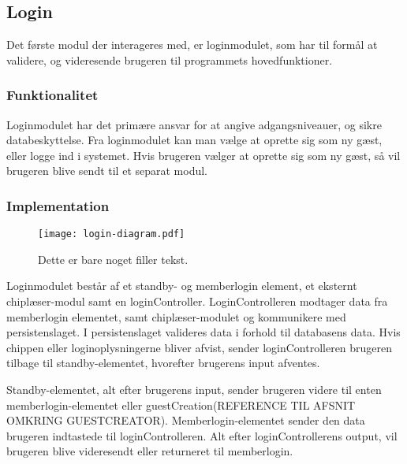 \subsection{Login}
\label{sub:login}

Det første modul der interageres med, er loginmodulet, som har til formål at validere, og videresende brugeren til programmets hovedfunktioner.

\subsubsection{Funktionalitet}
\label{ssub:login_funktionalitet}

Loginmodulet har det primære ansvar for at angive adgangsniveauer, og sikre databeskyttelse. Fra loginmodulet kan man vælge at oprette sig som ny gæst, eller logge ind i systemet. Hvis brugeren vælger at oprette sig som ny gæst, så vil brugeren blive sendt til et separat modul.

\subsubsection{Implementation}
\label{ssub:login_implementation}

\begin{figure}
  \centering
  \texttt{[image: login-diagram.pdf]}
  \caption{Dette er bare noget filler tekst.}
\end{figure}


Loginmodulet består af et standby- og memberlogin element, et eksternt chiplæser-modul samt en loginController. LoginControlleren modtager data fra memberlogin elementet, samt chiplæser-modulet og kommunikere med persistenslaget. I persistenslaget valideres data i forhold til databasens data. Hvis chippen eller loginoplysningerne bliver afvist, sender loginControlleren brugeren tilbage til standby-elementet, hvorefter brugerens input afventes.

Standby-elementet, alt efter brugerens input, sender brugeren videre til enten memberlogin-elementet eller guestCreation(REFERENCE TIL AFSNIT OMKRING GUESTCREATOR). Memberlogin-elementet sender den data brugeren indtastede til loginControlleren. Alt efter loginControllerens output, vil brugeren blive videresendt eller returneret til memberlogin.




